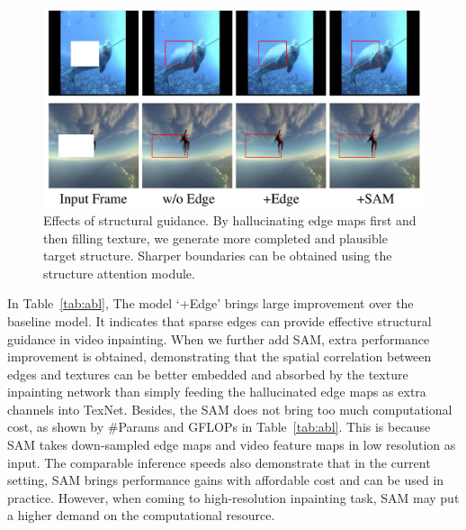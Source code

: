 \begin{figure}[t]
	\centering
	\includegraphics[width=0.97\columnwidth]{edgevis} %
	\caption{Effects of structural guidance. By hallucinating edge maps first and then filling texture, we generate more completed and plausible target structure. Sharper boundaries can be obtained using the structure attention module.}
	\label{edgevis}
\end{figure}



In Table~\ref{tab:abl}, The model `+Edge' brings large improvement over the baseline model.
It indicates that sparse edges can provide effective structural guidance in video inpainting. 
When we further add SAM, extra performance improvement is obtained, demonstrating that the spatial correlation between edges and textures can be better embedded and absorbed by the texture inpainting network than simply feeding the hallucinated edge maps as extra channels into TexNet. {\color{blue}Besides, the SAM does not bring too much computational cost, as shown by \#Params and GFLOPs in Table~\ref{tab:abl}. This is because SAM takes down-sampled edge maps and video feature maps in low resolution as input. The comparable inference speeds also demonstrate that in the current setting, SAM brings performance gains with affordable cost and can be used in practice. However, when coming to high-resolution inpainting task, SAM may put a higher demand on the computational resource.}
 

